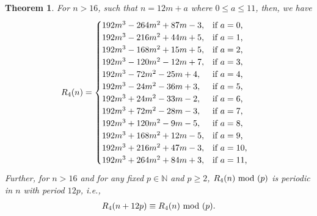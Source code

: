 \documentclass[12pt,reqno]{amsart}
\numberwithin{equation}{section}
\theoremstyle{plain}
\newtheorem{theorem}{Theorem}[section]
\begin{document}
	\begin{theorem}\label{R4thmexk} For $n>16$, such that $n=12m+a$ where $0\leq a\leq 11$, then, we have
		\begin{align}\label{R4formula}
			R_4(n) &=
			\begin{cases}
				192m^3 -264m^2+87m-3, & \textup{if $a=0$,}\\
				192m^3 -216m^2+44m+5, & \textup{if $a=1$,}\\
				192m^3 -168m^2+15m+5, & \textup{if $a=2$,}\\
				192m^3 -120m^2-12m+7, & \textup{if $a=3$,}\\
				192m^3 -72m^2-25m+4, & \textup{if $a=4$,}\\
				192m^3 -24m^2-36m+3, & \textup{if $a=5$,}\\
				192m^3 +24m^2-33m-2, & \textup{if $a=6$,}\\
				192m^3 +72m^2-28m-3, & \textup{if $a=7$,}\\
				192m^3 +120m^2-9m-5, & \textup{if $a=8$,}\\
				192m^3 +168m^2+12m-5, & \textup{if $a=9$,}\\
				192m^3 +216m^2+47m-3, & \textup{if $a=10$,}\\
				192m^3 +264m^2+84m+3, & \textup{if $a=11$,}\\
			\end{cases}
		\end{align}
		Further, for $n>16$ and for any fixed $p \in \mathbb{N}$ and $p\geq2$, $R_4(n) \textup{ mod }(p)$ is periodic in $n$ with period $12p$, i.e.,
		\begin{align*}
			R_4(n+12p) \equiv R_4(n) \textup{ mod } (p).
		\end{align*}
	\end{theorem}
\end{document}
